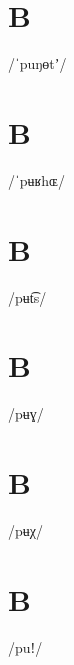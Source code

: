 \documentclass[10pt,a4paper,twoside]{book}
\begin{document}
\section*{B}

\begin{multicols}{3}
 {/ˈpuŋɵtʼ/} {}
\end{multicols}

\section*{B}

\begin{multicols}{3}
 {/ˈpʉʁhɶ/} {}
\end{multicols}

\section*{B}

\begin{multicols}{3}
 {/pʉt͡s/} {}
\end{multicols}

\section*{B}

\begin{multicols}{3}
 {/pʉɣ/} {}
\end{multicols}

\section*{B}

\begin{multicols}{3}
 {/pʉχ/} {}
\end{multicols}

\section*{B}

\begin{multicols}{3}
 {/puǃ/} {}
\end{multicols}
\end{document}
